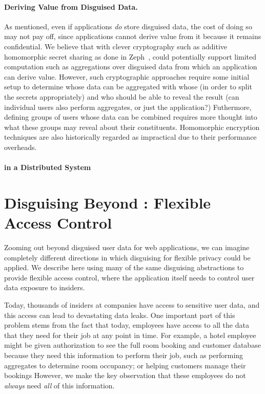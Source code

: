 %
\paragraph{Deriving Value from Disguised Data.}
As mentioned, even if applications \emph{do} store disguised data, the cost of
doing so may not pay off, since applications cannot derive value from it because
it remains confidential. 
%
We believe that with clever cryptography such as additive homomorphic secret
sharing as done in Zeph~\cite{zeph}, \sys could potentially support limited
computation such as aggregations over disguised data from which an application
can derive value.
%
However, such cryptographic approaches require some initial setup to determine
whose data can be aggregated with whose (in order to split the secrets
appropriately) and who should be able to reveal the result (can individual users
also perform aggregates, or just the application?) Futhermore, defining groups
of users whose data can be combined requires more thought into what these groups
may reveal about their constituents.
%
Homomorphic encryption techniques are also historically regarded as impractical
due to their performance overheads.


\paragraph{\sys in a Distributed System}

\section{Disguising Beyond \sys: Flexible Access Control}

Zooming out beyond disguised user data for web applications, we can imagine
completely different directions in which disguising for flexible privacy could
be applied. We describe here using many of the same disguising abstractions to
provide flexible access control, where the application itself needs to control
user data exposure to insiders.

Today, thousands of insiders at companies have access to sensitive user data,
and this access can lead to devastating data leaks.
%
One important part of this problem stems from the fact that today, employees
have access to all the data that they need for their job at any point in time.
For example, a hotel employee might be given authorization to see the full room
booking and customer database because they need this information to perform
their job, such as performing aggregates to determine room occupancy; or helping
customers manage their bookings
%
However, we make the key observation that these employees do not \emph{always} need
\emph{all} of this information.

